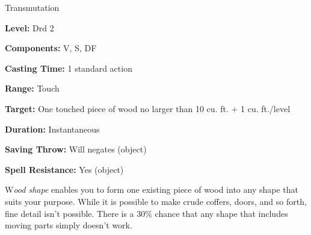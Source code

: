 
Transmutation

\textbf{Level:} Drd 2

\textbf{Components:} V, S, DF

\textbf{Casting Time:} 1 standard action

\textbf{Range:} Touch

\textbf{Target:} One touched piece of wood no larger than 10 cu. ft. + 1 cu. ft./level

\textbf{Duration:} Instantaneous

\textbf{Saving Throw:} Will negates (object)

\textbf{Spell Resistance:} Yes (object)

W\textit{ood shape} enables you to form one existing piece of wood into any shape 
that suits your purpose. While it is possible to make crude coffers, doors, and 
so forth, fine detail isn't possible. There is a 30\% chance that any shape that 
includes moving parts simply doesn't work.

